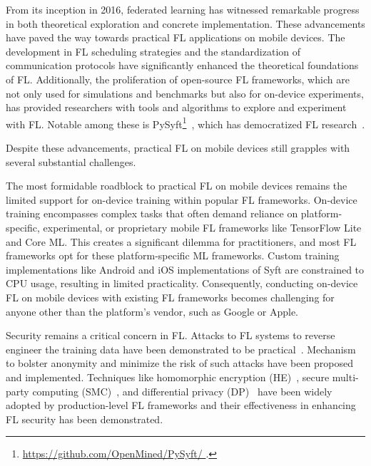 \documentclass[conference]{IEEEtran}
\begin{document}

From its inception in 2016,
federated learning has witnessed remarkable progress in both
theoretical exploration and concrete implementation.
These advancements have paved the way towards
practical FL applications on mobile devices.
The development in FL scheduling strategies and
the standardization of communication protocols have
significantly enhanced the theoretical foundations of FL.
Additionally,
the proliferation of open-source FL frameworks,
which are not only used for simulations and benchmarks but
also for on-device experiments,
has provided researchers with tools and algorithms to explore and
experiment with FL.
Notable among these is PySyft\footnote{\url{
    https://github.com/OpenMined/PySyft/
}.}~\cite{ryffel2018generic,Ziller2021,hall2021syft},
which has democratized FL research~\cite{sriraman2022device}.

Despite these advancements, practical FL on mobile devices still grapples with
several substantial challenges.

The most formidable roadblock to practical FL on mobile devices remains
the limited support for on-device training within popular FL frameworks.
On-device training encompasses complex tasks that
often demand reliance on platform-specific,
experimental, or
proprietary mobile FL frameworks like TensorFlow Lite and Core ML.
This creates a significant dilemma for practitioners,
and most FL frameworks opt for these platform-specific ML frameworks.
Custom training implementations like Android and iOS implementations of
Syft are constrained to CPU usage,
resulting in limited practicality.
Consequently, conducting on-device FL on mobile devices with
existing FL frameworks becomes challenging for
anyone other than the platform's vendor, such as Google or Apple.

Security remains a critical concern in FL.
Attacks to FL systems to reverse engineer the training data have been
demonstrated to be practical~\cite{sun2019really}.
Mechanism to bolster anonymity and
minimize the risk of such attacks have been proposed and implemented.
Techniques like
homomorphic encryption (HE)~\cite{wang2020homo},
secure multi-party computing (SMC)~\cite{bonawitz2016practical}, and
differential privacy
(DP)~\cite{dwork2006differential,geyer2017differentially} have been
widely adopted by production-level FL frameworks and
their effectiveness in enhancing FL security has been demonstrated.
\end{document}
